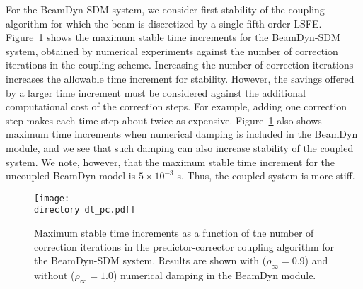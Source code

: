 \documentclass{aiaa-tc}
\def\directory{EPSF/}
\begin{document}
For the BeamDyn-SDM system, we consider first stability of the coupling algorithm for which the beam is discretized by a single fifth-order LSFE. 
Figure~\ref{fig:CoupledDTPC} shows the maximum stable time increments for the BeamDyn-SDM system, obtained by numerical experiments against the number of correction iterations in the coupling scheme.  
Increasing the number of correction iterations increases the allowable time increment for stability.  However, the savings offered by a larger time increment must be considered against the additional computational cost of the correction steps.  
For example, adding one correction step makes each time step about twice as expensive.
Figure~\ref{fig:CoupledDTPC} also shows maximum time increments when numerical damping is included in the BeamDyn module, and we see that such damping can also increase stability of the coupled system.  We note, however, that the maximum stable time increment for the uncoupled BeamDyn model is $5 \times 10^{-3}$ s.  Thus, the coupled-system is more stiff.

\begin{figure}[h!tp]
\centering
\texttt{[image: \\directory dt\_pc.pdf]}
\caption{Maximum stable time increments as a function of the number of correction iterations in the predictor-corrector coupling algorithm for the BeamDyn-SDM system. Results are shown with ($\rho_\infty = 0.9$) and without ($\rho_\infty = 1.0$) numerical damping in the BeamDyn module.
} 
\label{fig:CoupledDTPC}
\end{figure}
\end{document}
